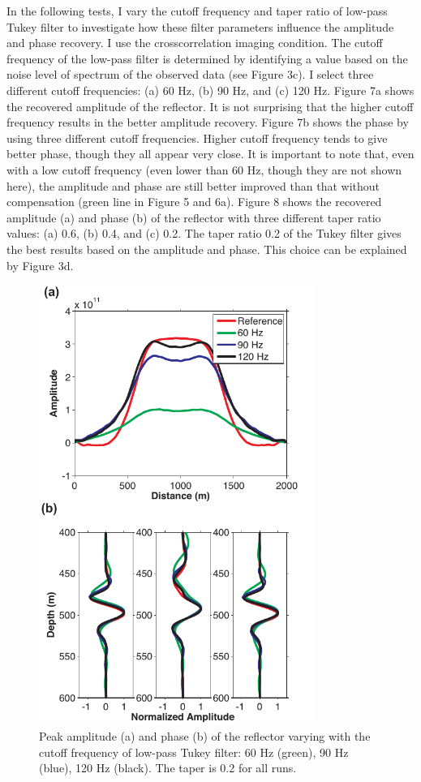 In the following tests, I vary the cutoff frequency and taper ratio of low-pass Tukey filter to investigate how these filter parameters influence the amplitude and phase recovery. I use the crosscorrelation imaging condition. The cutoff frequency of the low-pass filter is determined by identifying a value based on the noise level of spectrum of the observed data (see Figure 3c). I select three different cutoff frequencies: (a) 60 Hz, (b) 90 Hz, and (c) 120 Hz. Figure 7a shows the recovered amplitude of the reflector. It is not surprising that the higher cutoff frequency results in the better amplitude recovery. Figure 7b shows the phase by using three different cutoff frequencies. Higher cutoff frequency tends to give better phase, though they all appear very close. It is important to note that, even with a low cutoff frequency (even lower than 60 Hz, though they are not shown here), the amplitude and phase are still better improved than that without compensation (green line in Figure 5 and 6a). Figure 8 shows the recovered amplitude (a) and phase (b) of the reflector with three different taper ratio values: (a) 0.6, (b) 0.4, and (c) 0.2. The taper ratio 0.2 of the Tukey filter gives the best results based on the amplitude and phase. This choice can be explained by Figure 3d. 

 \begin{figure}[!htb]
   \centering
   \includegraphics[width=0.8\textwidth]{Fig/fig7-eps-converted-to}
   \caption{Peak amplitude (a) and phase (b) of the reflector varying with the cutoff frequency of low-pass Tukey filter: 60 Hz (green), 90 Hz (blue), 120 Hz (black). The taper is 0.2 for all runs.}
 \end{figure}

